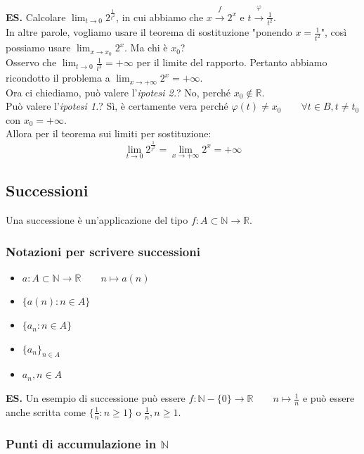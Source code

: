 \documentclass{article}
\begin{document}
\noindent\textbf{ES.} Calcolare $\lim_{t \to 0} 2^\frac{1}{t^2}$, in cui abbiamo che $x \overset{f}{\xrightarrow{}} 2^x$ e $t \overset{\varphi}{\xrightarrow{}} \frac{1}{t^2}$.\\
In altre parole, vogliamo usare il teorema di sostituzione "ponendo $x = \frac{1}{t^2}$", così possiamo usare $\lim_{x \to x_0} 2^x$. Ma chi è $x_0$?\\
Osservo che $\lim_{t \to 0} \frac{1}{t^2} = +\infty$ per il limite del rapporto. Pertanto abbiamo ricondotto il problema a $\lim_{x \to +\infty} 2^x = +\infty$. \\
Ora ci chiediamo, può valere l'\textit{ipotesi 2.}? No, perché $x_0 \notin \mathbb{R}$.\\
Può valere l'\textit{ipotesi 1.}? Sì, è certamente vera perché $\varphi(t) \neq x_0 \qquad \forall t \in B, t \neq t_0$ con $x_0 = +\infty$.\\
Allora per il teorema sui limiti per sostituzione:
\begin{equation*}
    \lim_{t \to 0} 2^\frac{1}{t^2} = \lim_{x \to +\infty} 2^x = +\infty
\end{equation*}

\subsection{Successioni}
Una successione è un'applicazione del tipo $f: A \subset \mathbb{N} \xrightarrow{} \mathbb{R}$. 

\subsubsection{Notazioni per scrivere successioni}
\begin{itemize}
    \item $a: A \subset \mathbb{N} \xrightarrow{} \mathbb{R} \qquad n \longmapsto a(n)$
    \item $\{a(n) : n \in A\}$
    \item $\{a_n : n \in A\}$
    \item $\{a_n\}_{n \in A}$
    \item $a_n, n \in A$
\end{itemize}

\noindent\textbf{ES.} Un esempio di successione può essere $f: \mathbb{N} - \{0\} \xrightarrow{} \mathbb{R} \qquad n \longmapsto \frac{1}{n}$ e può essere anche scritta come $\{\frac{1}{n} : n \geq 1\}$ o $\frac{1}{n}, n \geq 1$.

\subsubsection{Punti di accumulazione in $\mathbb{N}$}
\end{document}

